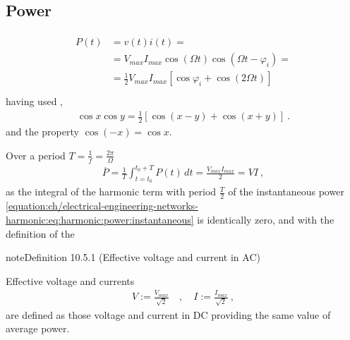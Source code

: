\documentclass[letterpaper,10pt,italian]{jupyterBook}
\begin{document}
\subsection{Power}
\label{\detokenize{ch/electrical-engineering-networks-harmonic:power}}\label{\detokenize{ch/electrical-engineering-networks-harmonic:classical-electromagnetism-electrical-engineering-newtork-analysis-harmonic-power}}
\sphinxAtStartPar
{}
\begin{equation}\label{equation:ch/electrical-engineering-networks-harmonic:eq:harmonic:power:instantaneous}
\begin{split}\begin{aligned}
  P(t) 
  & = v(t) i(t) = \\
  & = V_{max} I_{max}  \cos (\Omega t )  \cos (\Omega t - \varphi_i) = \\ 
  & = \frac{1}{2} V_{max} I_{max} \left[ \cos \varphi_i +  \cos ( 2 \Omega t ) \right]  \\ 
\end{aligned}\end{split}
\end{equation}
\sphinxAtStartPar
having used ,
\begin{equation*}
\begin{split}\cos x \cos y = \frac{1}{2} \left[ \cos(x-y) + \cos(x+y) \right] \ .\end{split}
\end{equation*}
\sphinxAtStartPar
and the property \(\cos(-x) = \cos x\).

\sphinxAtStartPar
{} Over a period \(T = \frac{1}{f} = \frac{2 \pi}{\Omega}\)
\begin{equation*}
\begin{split}\overline{P} = \frac{1}{T} \int_{t=t_0}^{t_0+T} P(t) \, dt = \frac{V_{max} I_{max}}{2} = V I\ ,\end{split}
\end{equation*}
\sphinxAtStartPar
as the integral of the harmonic term with period \(\frac{T}{2}\) of the instantaneous power \eqref{equation:ch/electrical-engineering-networks-harmonic:eq:harmonic:power:instantaneous} is identically zero, and with the definition of the 
\label{ch/electrical-engineering-networks-harmonic:harmonic:effective-values}
\begin{sphinxadmonition}{note}{Definition 10.5.1 (Effective voltage and current in AC)}



\sphinxAtStartPar
Effective voltage and currents
\begin{equation*}
\begin{split}V := \frac{V_{max}}{\sqrt{2}} \quad , \quad I := \frac{I_{max}}{\sqrt{2}} \ , \end{split}
\end{equation*}
\sphinxAtStartPar
are defined as those voltage and current in DC providing the same value of average power.
\end{sphinxadmonition}
\end{document}
